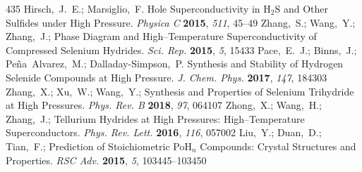 \documentclass[12pt,letterpaper,oneside]{article}
\begin{document}
\begin{mcitethebibliography}{435}
\EndOfBibitem
{}
Hirsch,~J.~E.; Marsiglio,~F. Hole Superconductivity in H$_2$S and Other
  Sulfides under High Pressure. \emph{Physica C} \textbf{2015}, \emph{511},
  45--49\relax
\mciteBstWouldAddEndPuncttrue
\mciteSetBstMidEndSepPunct{\mcitedefaultmidpunct}
{\mcitedefaultendpunct}{\mcitedefaultseppunct}\relax
\EndOfBibitem
{}
Zhang,~S.; Wang,~Y.; Zhang,~J.;   Phase
  Diagram and High--Temperature Superconductivity of Compressed Selenium
  Hydrides. \emph{Sci. Rep.} \textbf{2015}, \emph{5}, 15433\relax
\mciteBstWouldAddEndPuncttrue
\mciteSetBstMidEndSepPunct{\mcitedefaultmidpunct}
{\mcitedefaultendpunct}{\mcitedefaultseppunct}\relax
\EndOfBibitem
{}
Pace,~E.~J.; Binns,~J.; Pe{\~n}a~Alvarez,~M.; Dalladay-Simpson,~P. Synthesis
  and Stability of Hydrogen Selenide Compounds at High Pressure. \emph{J. Chem.
  Phys.} \textbf{2017}, \emph{147}, 184303\relax
\mciteBstWouldAddEndPuncttrue
\mciteSetBstMidEndSepPunct{\mcitedefaultmidpunct}
{\mcitedefaultendpunct}{\mcitedefaultseppunct}\relax
\EndOfBibitem
{}
Zhang,~X.; Xu,~W.; Wang,~Y.; 
  Synthesis and Properties of Selenium Trihydride at High Pressures.
  \emph{Phys. Rev. B} \textbf{2018}, \emph{97}, 064107\relax
\mciteBstWouldAddEndPuncttrue
\mciteSetBstMidEndSepPunct{\mcitedefaultmidpunct}
{\mcitedefaultendpunct}{\mcitedefaultseppunct}\relax
\EndOfBibitem
{}
Zhong,~X.; Wang,~H.; Zhang,~J.;   Tellurium
  Hydrides at High Pressures: High--Temperature Superconductors. \emph{Phys.
  Rev. Lett.} \textbf{2016}, \emph{116}, 057002\relax
\mciteBstWouldAddEndPuncttrue
\mciteSetBstMidEndSepPunct{\mcitedefaultmidpunct}
{\mcitedefaultendpunct}{\mcitedefaultseppunct}\relax
\EndOfBibitem
{}
Liu,~Y.; Duan,~D.; Tian,~F.;   Prediction of
  Stoichiometric PoH$_{n}$ Compounds: Crystal Structures and Properties.
  \emph{RSC Adv.} \textbf{2015}, \emph{5}, 103445--103450\relax
\mciteBstWouldAddEndPuncttrue
\mciteSetBstMidEndSepPunct{\mcitedefaultmidpunct}
{\mcitedefaultendpunct}{\mcitedefaultseppunct}\relax

\end{mcitethebibliography}
\end{document}
